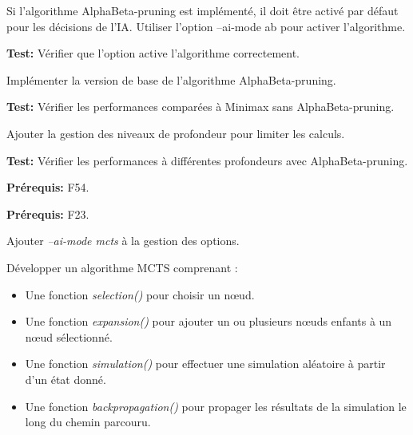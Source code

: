 \documentclass{article}
\begin{document}
\begin{needbox}
    \begin{subneedbox}
        Si l'algorithme AlphaBeta-pruning est implémenté, il doit être activé par défaut pour les décisions de l'IA.
        Utiliser l'option --ai-mode ab pour activer l’algorithme.

        \textbf{Test:} Vérifier que l'option active l'algorithme correctement.
    \end{subneedbox}
    
    \begin{subneedbox}
        Implémenter la version de base de l’algorithme AlphaBeta-pruning.

        \textbf{Test:} Vérifier les performances comparées à Minimax sans AlphaBeta-pruning.
    \end{subneedbox}
    
    \begin{subneedbox}
        Ajouter la gestion des niveaux de profondeur pour limiter les calculs.

        \textbf{Test:} Vérifier les performances à différentes profondeurs avec AlphaBeta-pruning.
    \end{subneedbox}
    \textbf{Prérequis:} F54.
\end{needbox}

\begin{needbox}
    \textbf{Prérequis:} F23.
    \begin{subneedbox}
        Ajouter \textit{--ai-mode mcts} à la gestion des options.
    \end{subneedbox}

    \begin{subneedbox}
        Développer un algorithme MCTS comprenant :
        \begin{itemize}
            \item Une fonction \textit{selection()} pour choisir un nœud.
            \item Une fonction \textit{expansion()} pour ajouter un ou plusieurs nœuds enfants à un nœud sélectionné.
            \item Une fonction \textit{simulation()} pour effectuer une simulation aléatoire à partir d'un état donné.
            \item Une fonction \textit{backpropagation()} pour propager les résultats de la simulation le long du chemin parcouru.
        \end{itemize}
    \end{subneedbox}
\end{needbox}
\end{document}
